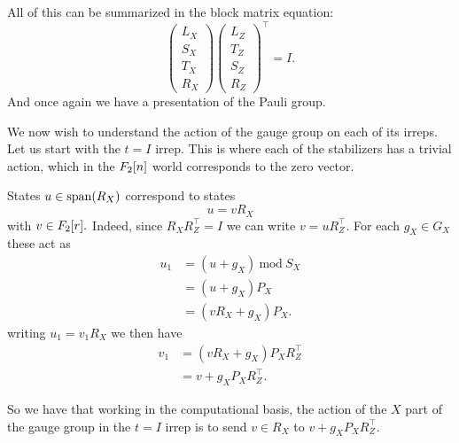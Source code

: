 \documentclass[12pt]{article}
\begin{document}
All of this can be summarized in the block matrix equation:
$$
\left( \begin{array}{l}
L_X\\
S_X\\
T_X\\
R_X
\end{array} \right)
\left( \begin{array}{l}
L_Z\\
T_Z\\
S_Z\\
R_Z
\end{array} \right)^\top =
I.
$$
And once again we have a presentation of the Pauli group.


We now wish to understand the action of the
gauge group on each of its irreps.
Let us start with the $t=I$ irrep.
This is where each of the stabilizers has
a trivial action, which in the $F_2[n]$ world
corresponds to the zero vector.

States $u\in\mathrm{span}(R_X)$ correspond to
states
$$
    u = v R_X
$$
with $v\in F_2[r].$
Indeed, since $R_X R_Z^\top = I$
we can write $v = u R_Z^\top.$
For each $g_X\in G_X$ these act as
\begin{align*}
    u_1 &= (u + g_X) \ \mbox{mod}\  S_X \\
        &= (u + g_X) P_X \\
        &= (v R_X + g_X) P_X.
\end{align*}
writing $u_1 = v_1 R_X$ we then have
\begin{align*}
    v_1 &= (v R_X + g_X) P_X R_Z^\top \\
        &= v + g_X P_X R_Z^\top.
\end{align*}

So we have that working in the computational
basis, the action of the $X$ part of the
gauge group in the $t=I$ irrep is to send
$v\in R_X$ to 
$v + g_X P_X R_Z^\top.$
\end{document}
